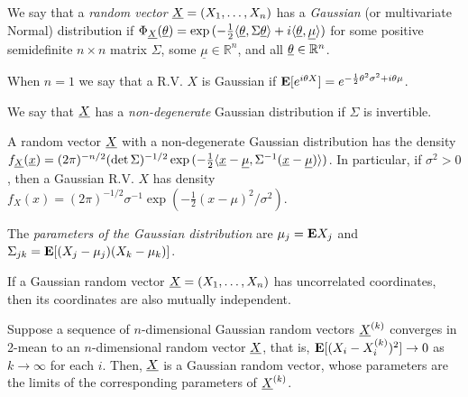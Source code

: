 
\begin{definition*}
We say that a \emph{random vector} ${\underline{X}}=(X_1,\dots,X_n)$ has a \emph{Gaussian} (or multivariate Normal) distribution if $\Phi_{\underline{X}}(\underline{\theta}) = \exp{(-\frac12 \langle \underline{\theta}, \Sigma\underline{\theta}\rangle + i \langle \underline{\theta}, \underline \mu \rangle)}$ for some positive semidefinite $n\times n$ matrix $\Sigma$, some $\underline \mu \in \mathbb R^n$, and all $\underline{\theta} \in \mathbb R^n$.
\end{definition*}

\begin{remark*}
When $n=1$ we say that a R.V. $X$ is Gaussian if $\mathbf{E}[e^{i\theta X}] = e^{-\frac12 \theta^2 \sigma^2 + i\theta\mu}$.
\end{remark*}

\begin{definition*}
We say that ${\underline{X}}$ has a \emph{non-degenerate} Gaussian distribution if $\Sigma$ is invertible.
\end{definition*}

\begin{proposition*}
A random vector ${\underline{X}}$ with a non-degenerate Gaussian distribution has the density
$f_{\underline{X}}(\underline x) = (2\pi)^{-n/2}(\det\Sigma)^{-1/2} \exp{(-\frac12 \langle\underline x - \underline \mu, \Sigma^{-1}(\underline x - \underline \mu)\rangle)}$. In particular, if $\sigma^2 > 0$, then a Gaussian R.V. $X$ has density $f_X(x) = (2\pi)^{-1/2} \sigma^{-1} \exp{(-\frac12 (x-\mu)^2/\sigma^2)}$.
\end{proposition*}

\begin{proposition*}
The \emph{parameters of the Gaussian distribution} are $\mu_j = \mathbf{E} X_j$ and $\Sigma_{jk} = \mathbf{E}[(X_j-\mu_j)(X_k-\mu_k)]$.
\end{proposition*}


\begin{proposition*}
If a Gaussian random vector ${\underline{X}} = (X_1,\dots,X_n)$ has uncorrelated coordinates, then its coordinates are also mutually independent.
\end{proposition*}

\begin{proposition*}
Suppose a sequence of $n$-dimensional Gaussian random vectors ${\underline{X}}^{(k)}$ converges in 2-mean to an $n$-dimensional random vector ${\underline{X}}$, that is, $\mathbf{E}[(X_i - X_i^{(k)})^2] \to 0$ as $k\to\infty$ for each $i$. Then, ${\underline{X}}$ is a Gaussian random vector, whose parameters are the limits of the corresponding parameters of ${\underline{X}}^{(k)}$.
\end{proposition*}

